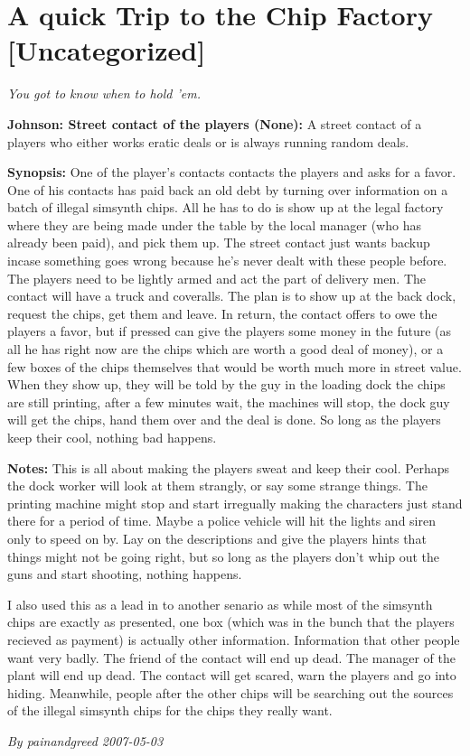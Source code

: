 \documentclass[letterpaper,twocolumn,10.5pt]{article}
\newenvironment{scenario}[6]
	{
		\section{#1 {\small[#2]}}
		\textit{#3}
		\def\TMPSCENARIO{#4 #5}
	}
	{\small\textit{By \TMPSCENARIO}}
\newcommand{\johnson}[2]{\textbf{Johnson: #1 (#2):}}
\newcommand{\synopsis}{\textbf{Synopsis: }}
\newcommand{\notes}{\textbf{Notes: }}
\begin{document}
\begin{scenario}{ A quick Trip to the Chip Factory}
	{Uncategorized}
	{ You got to know when to hold 'em.}
	{painandgreed}
	{2007-05-03}
	{https://forum.rpg.net/showthread.php?321504-Shadowrun-4th-101-Instant-Scenarios\&p=7250148#post7250148}

\johnson{Street contact of the players}{None} A street contact of a players who either works eratic deals or is always running random deals.

\synopsis  One of the player's contacts contacts the players and asks for a favor. One of his contacts has paid back an old debt by turning over information on a batch of illegal simsynth chips. All he has to do is show up at the legal factory where they are being made under the table by the local manager (who has already been paid), and pick them up. The street contact just wants backup incase something goes wrong because he's never dealt with these people before. The players need to be lightly armed and act the part of delivery men. The contact will have a truck and coveralls. The plan is to show up at the back dock, request the chips, get them and leave. In return, the contact offers to owe the players a favor, but if pressed can give the players some money in the future (as all he has right now are the chips which are worth a good deal of money), or a few boxes of the chips themselves that would be worth much more in street value. When they show up, they will be told by the guy in the loading dock the chips are still printing, after a few minutes wait, the machines will stop, the dock guy will get the chips, hand them over and the deal is done. So long as the players keep their cool, nothing bad happens. 

\notes  This is all about making the players sweat and keep their cool. Perhaps the dock worker will look at them strangly, or say some strange things. The printing machine might stop and start irregually making the characters just stand there for a period of time. Maybe a police vehicle will hit the lights and siren only to speed on by. Lay on the descriptions and give the players hints that things might not be going right, but so long as the players don't whip out the guns and start shooting, nothing happens.

I also used this as a lead in to another senario as while most of the simsynth chips are exactly as presented, one box (which was in the bunch that the players recieved as payment) is actually other information. Information that other people want very badly. The friend of the contact will end up dead. The manager of the plant will end up dead. The contact will get scared, warn the players and go into hiding. Meanwhile, people after the other chips will be searching out the sources of the illegal simsynth chips for the chips they really want. 

\end{scenario}
\end{document}
